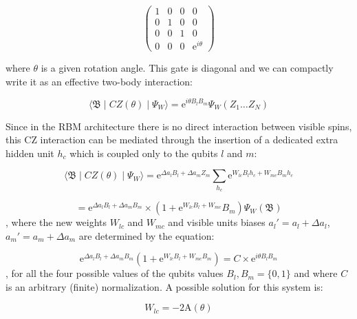 \begin{equation}
    \begin{pmatrix}
        1 & 0 & 0 & 0 \\
        0 & 1 & 0 & 0 \\
        0 & 0 & 1 & 0 \\
        0 & 0 & 0 & \mathrm{e}^{i\theta}
    \end{pmatrix}
\end{equation}

where $\theta$ is a given rotation angle. This gate is diagonal and we can compactly write it as an 
effective two-body interaction:

\begin{equation}
    \langle \mathfrak{B} \mid CZ(\theta) \mid \Psi_{W}  \rangle = 
    \mathrm{e}^{i\theta B_{l}B_{m}}\Psi_{W}(Z_{1} \dots Z_{N})
\end{equation}

Since in the RBM architecture there is no direct interaction between visible spins, this CZ interaction
can be mediated through the insertion of a dedicated extra hidden unit $h_{c}$ which is coupled only 
to the qubits $l$ and $m$: 

\begin{equation}
    \langle \mathfrak{B} \mid CZ(\theta) \mid \Psi_{W}  \rangle = 
    \mathrm{e}^{\Delta a_{l} B_{l} + \Delta a_{m} Z_{m}} \sum_{h_{c}}\mathrm{e}^{W_{lc} B_{l} h_{c} + W_{mc} B_{m} h_{c}}
\end{equation}

\begin{equation}
    = \mathrm{e}^{\Delta a_{l} B_{l} + \Delta a_{m} B_{m}} \times (1 + \mathrm{e}^{W_{lc} B_{l} + W_{mc}} B_{m}) \Psi_{W}(\mathfrak{B})
\end{equation}
, where the new weights $W_{lc}$ and $W_{mc}$ and visible units biases $a_{l}\prime= a_{l} + \Delta a_{l}$,
$a_{m}\prime= a_{m} + \Delta a_{m}$ are determined by the equation:

\begin{equation}
   \mathrm{e}^{\Delta a_{l} B_{l} + \Delta a_{m} B_{m}}(1 + \mathrm{e}^{W_{lc} B_{l} + W_{mc} B_{m}}) = C \times \mathrm{e}^{i \theta B_{l} B_{m}} 
\end{equation}
, for all the four possible values of the qubits values $B_{l}, B_{m} = \{0,1\}$ and where $C$ is an arbitrary (finite)
normalization. A possible solution for this system is:

\begin{equation}
   W_{lc} = -2\mathrm{A}(\theta) 
\end{equation}

